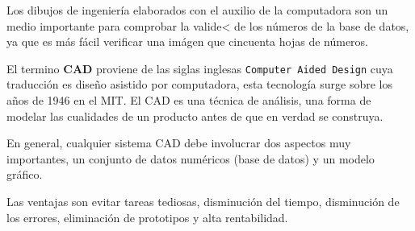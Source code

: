 Los dibujos de ingeniería elaborados con el auxilio de la computadora son un medio importante para comprobar la valide< de los números de la base de datos, ya que es más fácil verificar una imágen que cincuenta hojas de números.

El termino \textbf{CAD} proviene de las siglas inglesas \texttt{Computer Aided Design} cuya traducción es diseño asistido por computadora, esta tecnología surge sobre los años de 1946 en el MIT.
El CAD es una técnica de análisis, una forma de modelar las cualidades de un producto antes de que en verdad se construya.

En general, cualquier sistema CAD debe involucrar dos aspectos muy importantes, un conjunto de datos numéricos (base de datos) y un modelo gráfico.

Las ventajas son evitar tareas tediosas, disminución del tiempo, disminución de los errores, eliminación de prototipos y alta rentabilidad.